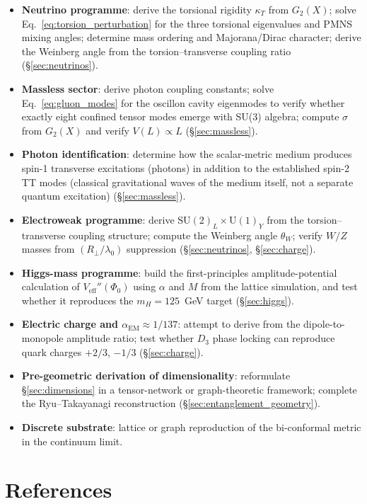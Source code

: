 \documentclass[11pt]{article}
\begin{document}
\begin{itemize}
  \item \textbf{Neutrino programme}: derive the
    torsional rigidity $\kappa_T$ from $G_2(X)$;
    solve Eq.~\eqref{eq:torsion_perturbation}
    for the three torsional eigenvalues and PMNS
    mixing angles; determine mass ordering and
    Majorana/Dirac character; derive the Weinberg
    angle from the torsion--transverse coupling
    ratio (\S\ref{sec:neutrinos}).
  \item \textbf{Massless sector}: derive photon
    coupling constants; solve
    Eq.~\eqref{eq:gluon_modes} for the oscillon
    cavity eigenmodes to verify whether exactly
    eight confined tensor modes emerge with SU(3)
    algebra; compute $\sigma$ from $G_2(X)$ and
    verify $V(L) \propto L$
    (\S\ref{sec:massless}).
  \item \textbf{Photon identification}:
    determine how the scalar-metric medium
    produces spin-1 transverse excitations (photons)
    in addition to the established spin-2 TT modes
    (classical gravitational waves of the medium itself,
    not a separate quantum excitation)
    (\S\ref{sec:massless}).
  \item \textbf{Electroweak programme}: derive
    $\text{SU}(2)_L \times \text{U}(1)_Y$ from
    the torsion--transverse coupling structure;
    compute the Weinberg angle $\theta_W$;
    verify $W/Z$ masses from
    $(R_\perp / \lambda_0)$ suppression
    (\S\ref{sec:neutrinos}, \S\ref{sec:charge}).
  \item \textbf{Higgs-mass programme}:
    build the first-principles amplitude-potential
    calculation of $V_{\mathrm{eff}}''(\Phi_0)$ using
    $\alpha$ and $M$ from the lattice simulation, and test
    whether it reproduces the $m_H=125$~GeV target
    (\S\ref{sec:higgs}).
  \item \textbf{Electric charge and
    $\alpha_{\mathrm{EM}} \approx 1/137$}: attempt to derive
    from the dipole-to-monopole amplitude ratio; test whether
    $D_3$ phase locking can reproduce quark charges
    $+2/3$, $-1/3$
    (\S\ref{sec:charge}).
  \item \textbf{Pre-geometric derivation of
    dimensionality}: reformulate
    \S\ref{sec:dimensions} in a tensor-network
    or graph-theoretic framework; complete the
    Ryu--Takayanagi reconstruction
    (\S\ref{sec:entanglement_geometry}).
  \item \textbf{Discrete substrate}: lattice
    or graph reproduction of the bi-conformal
    metric in the continuum limit.
\end{itemize}

\clearpage
{}
\section*{References}

\end{document}
